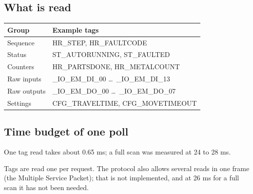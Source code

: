 \documentclass[a4paper,10.5pt]{article}
\newcommand{\code}[1]{{\ttfamily\small #1}}
\begin{document}
\begin{minipage}[t]{0.53\textwidth}
\subsection{What is read}
\begin{tabularx}{\linewidth}{@{}lY@{}}
\toprule
\textbf{Group} & \textbf{Example tags} \\
\midrule
Sequence & \code{HR\_STEP}, \code{HR\_FAULTCODE} \\
Status & \code{ST\_AUTORUNNING}, \code{ST\_FAULTED} \\
Counters & \code{HR\_PARTSDONE}, \code{HR\_METALCOUNT} \\
Raw inputs & \code{\_IO\_EM\_DI\_00} \dots\ \code{\_IO\_EM\_DI\_13} \\
Raw outputs & \code{\_IO\_EM\_DO\_00} \dots\ \code{\_IO\_EM\_DO\_07} \\
Settings & \code{CFG\_TRAVELTIME}, \code{CFG\_MOVETIMEOUT} \\
\bottomrule
\end{tabularx}
\end{minipage}\hfill
\begin{minipage}[t]{0.43\textwidth}
\subsection{Time budget of one poll}

{\small\color{sub}One tag read takes about 0.65 ms; a full scan was measured at 24 to 28 ms.}
\end{minipage}

\medskip
Tags are read one per request. The protocol also allows several reads in one frame (the Multiple Service
Packet); that is not implemented, and at 26 ms for a full scan it has not been needed.
\end{document}
